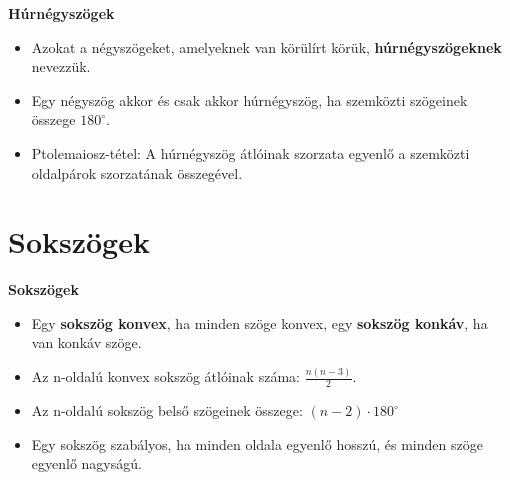 \documentclass[11pt]{beamer}
\begin{document}
\begin{frame}[<+->]
\begin{block}{\textbf{Húrnégyszögek}}
\begin{itemize}[label=$\circ$]
\item Azokat a négyszögeket, amelyeknek van körülírt körük, \textbf{húrnégyszögeknek} nevezzük.
\item Egy négyszög akkor és csak akkor húrnégyszög, ha szemközti szögeinek összege $180^\circ$.
\item Ptolemaiosz-tétel: A húrnégyszög átlóinak szorzata egyenlő a szemközti oldalpárok szorzatának összegével.
\end{itemize}
\end{block}
\end{frame}

\section{\textbf{Sokszögek}}
\begin{frame}[<+->]
\begin{block}{\textbf{Sokszögek}}
\begin{itemize}[label=$\circ$]
\item Egy \textbf{sokszög konvex}, ha minden szöge konvex, egy \textbf{sokszög konkáv}, ha van konkáv szöge.
\item Az n-oldalú konvex sokszög átlóinak száma: $\frac{n(n-3)}{2}$.
\item Az n-oldalú sokszög belső szögeinek összege: $(n-2) \cdot 180^\circ$
\item Egy sokszög szabályos, ha minden oldala egyenlő hosszú, és minden szöge egyenlő nagyságú.
\end{itemize}
\end{block}
\end{frame}
\end{document}
